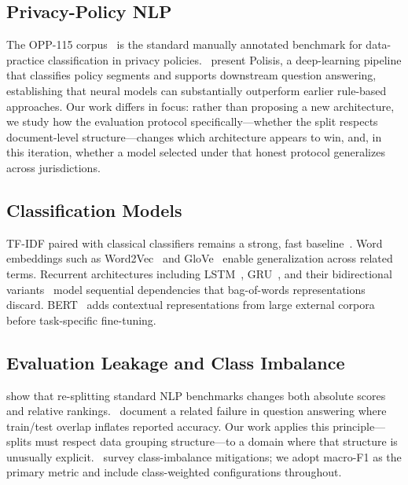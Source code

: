 \documentclass[11pt]{article}
\begin{document}
\subsection{Privacy-Policy NLP}

The OPP-115 corpus~\cite{wilson-etal-2016-creation} is the standard manually annotated benchmark for data-practice classification in privacy policies.\ \citet{harkous-etal-2018-polisis} present Polisis, a deep-learning pipeline that classifies policy segments and supports downstream question answering, establishing that neural models can substantially outperform earlier rule-based approaches. Our work differs in focus: rather than proposing a new architecture, we study how the evaluation protocol specifically—whether the split respects document-level structure—changes which architecture appears to win, and, in this iteration, whether a model selected under that honest protocol generalizes across jurisdictions.

\subsection{Classification Models}

TF-IDF paired with classical classifiers remains a strong, fast baseline~\cite{pedregosa-etal-2011-scikit}. Word embeddings such as Word2Vec~\cite{mikolov-etal-2013-efficient} and GloVe~\cite{pennington-etal-2014-glove} enable generalization across related terms. Recurrent architectures including LSTM~\cite{hochreiter-schmidhuber-1997-lstm}, GRU~\cite{cho-etal-2014-learning}, and their bidirectional variants~\cite{schuster-paliwal-1997-bidirectional} model sequential dependencies that bag-of-words representations discard. BERT~\cite{devlin-etal-2019-bert} adds contextual representations from large external corpora before task-specific fine-tuning.

\subsection{Evaluation Leakage and Class Imbalance}

\citet{gorman-bedrick-2019-need} show that re-splitting standard NLP benchmarks changes both absolute scores and relative rankings.\ \citet{lewis-etal-2021-question} document a related failure in question answering where train/test overlap inflates reported accuracy. Our work applies this principle---splits must respect data grouping structure---to a domain where that structure is unusually explicit.\ \citet{johnson-khoshgoftaar-2019-survey} survey class-imbalance mitigations; we adopt macro-F1 as the primary metric and include class-weighted configurations throughout.
\end{document}
